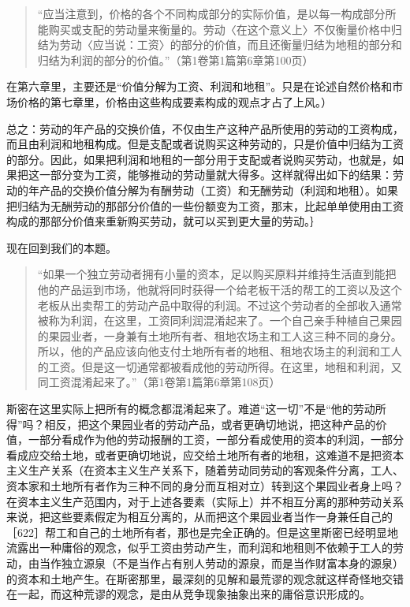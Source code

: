 \begin{quote}{“应当注意到，价格的各个不同构成部分的实际价值，是以每一构成部分所能购买或支配的劳动量来衡量的。劳动〈在这个意义上〉不仅衡量价格中归结为劳动〈应当说：工资〉的部分的价值，而且还衡量归结为地租的部分和归结为利润的部分的价值。”（第1卷第1篇第6章第100页）}\end{quote}

在第六章里，主要还是“价值分解为工资、利润和地租”。只是在论述自然价格和市场价格的第七章里，价格由这些构成要素构成的观点才占了上风。）

总之：劳动的年产品的交换价值，不仅由生产这种产品所使用的劳动的工资构成，而且由利润和地租构成。但是支配或者说购买这种劳动的，只是价值中归结为工资的部分。因此，如果把利润和地租的一部分用于支配或者说购买劳动，也就是，如果把这一部分变为工资，能够推动的劳动量就大得多。这样就得出如下的结果：劳动的年产品的交换价值分解为有酬劳动（工资）和无酬劳动（利润和地租）。如果把归结为无酬劳动的那部分价值的一些份额变为工资，那末，比起单单使用由工资构成的那部分价值来重新购买劳动，就可以买到更大量的劳动。｝

现在回到我们的本题。

\begin{quote}{“如果一个独立劳动者拥有小量的资本，足以购买原料并维持生活直到能把他的产品运到市场，他就将同时获得一个给老板干活的帮工的工资以及这个老板从出卖帮工的劳动产品中取得的利润。不过这个劳动者的全部收入通常被称为利润，在这里，工资同利润混淆起来了。一个自己亲手种植自己果园的果园业者，一身兼有土地所有者、租地农场主和工人这三种不同的身分。所以，他的产品应该向他支付土地所有者的地租、租地农场主的利润和工人的工资。但是这一切通常都被看成他的劳动所得。在这里，地租和利润，又同工资混淆起来了。”（第1卷第1篇第6章第108页）}\end{quote}

斯密在这里实际上把所有的概念都混淆起来了。难道“这一切”不是“他的劳动所得”吗？相反，把这个果园业者的劳动产品，或者更确切地说，把这种产品的价值，一部分看成作为他的劳动报酬的工资，一部分看成使用的资本的利润，一部分看成应交给土地，或者更确切地说，应交给土地所有者的地租，这难道不是把资本主义生产关系（在资本主义生产关系下，随着劳动同劳动的客观条件分离，工人、资本家和土地所有者作为三种不同的身分而互相对立）转到这个果园业者身上吗？在资本主义生产范围内，对于上述各要素（实际上）并不相互分离的那种劳动关系来说，把这些要素假定为相互分离的，从而把这个果园业者当作一身兼任自己的［622］帮工和自己的土地所有者，那也是完全正确的。但是这里斯密已经明显地流露出一种庸俗的观念，似乎工资由劳动产生，而利润和地租则不依赖于工人的劳动，由当作独立源泉（不是当作占有别人劳动的源泉，而是当作财富本身的源泉）的资本和土地产生。在斯密那里，最深刻的见解和最荒谬的观念就这样奇怪地交错在一起，而这种荒谬的观念，是由从竞争现象抽象出来的庸俗意识形成的。

